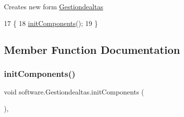 Creates new form \mbox{\hyperlink{classsoftware_1_1_gestiondealtas}{Gestiondealtas}} 
\begin{DoxyCode}
17                             \{
18         \mbox{\hyperlink{classsoftware_1_1_gestiondealtas_ac4320b7b16692e44ece6ddc1a75450d9}{initComponents}}();
19     \}
\end{DoxyCode}


\subsection{Member Function Documentation}
\mbox{\label{classsoftware_1_1_gestiondealtas_ac4320b7b16692e44ece6ddc1a75450d9}} 
\subsubsection{\texorpdfstring{init\+Components()}{initComponents()}}
{\footnotesize\ttfamily void software.\+Gestiondealtas.\+init\+Components (\begin{DoxyParamCaption}{ }\end{DoxyParamCaption})\hspace{0.3cm}{\ttfamily [inline]}, {\ttfamily [private]}}

